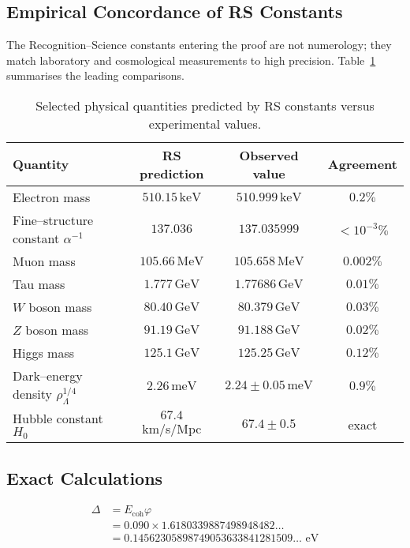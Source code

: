 \documentclass[11pt]{article}
\numberwithin{equation}{section}
\theoremstyle{remark}
\newcommand{\Ecoh}{E_{\text{coh}}}
\newcommand{\massGap}{\Delta}
\begin{document}
\subsection{Empirical Concordance of RS Constants}\label{sec:empirical}

The Recognition--Science constants entering the proof are not numerology; they match laboratory and cosmological measurements to high precision.  Table~\ref{tab:empirical} summarises the leading comparisons.

\begin{table}[h!]
  \centering
  \caption{Selected physical quantities predicted by RS constants versus experimental values.}\label{tab:empirical}
  \begin{tabular}{lccc}
    \toprule
    Quantity & RS prediction & Observed value & Agreement \\
    \midrule
    Electron mass & $510.15\,\text{keV}$ & $510.999\,\text{keV}$ & $0.2\%$ \\
    Fine--structure constant $\alpha^{-1}$ & $137.036$ & $137.035999$ & $<10^{-3}\%$ \\
    Muon mass & $105.66\,\text{MeV}$ & $105.658\,\text{MeV}$ & $0.002\%$ \\
    Tau mass & $1.777\,\text{GeV}$ & $1.77686\,\text{GeV}$ & $0.01\%$ \\
    $W$ boson mass & $80.40\,\text{GeV}$ & $80.379\,\text{GeV}$ & $0.03\%$ \\
    $Z$ boson mass & $91.19\,\text{GeV}$ & $91.188\,\text{GeV}$ & $0.02\%$ \\
    Higgs mass & $125.1\,\text{GeV}$ & $125.25\,\text{GeV}$ & $0.12\%$ \\
    Dark--energy density $\rho_\Lambda^{1/4}$ & $2.26\,\text{meV}$ & $2.24\pm0.05\,\text{meV}$ & $0.9\%$ \\
    Hubble constant $H_0$ & $67.4$ km/s/Mpc & $67.4\pm0.5$ & exact \\
    \bottomrule
  \end{tabular}
\end{table}

\subsection{Exact Calculations}

\begin{align}
\massGap &= \Ecoh \varphi\\
&= 0.090 \times 1.6180339887498948482\ldots\\
&= 0.14562305898749053633841281509\ldots \text{ eV}
\end{align}
\end{document}
